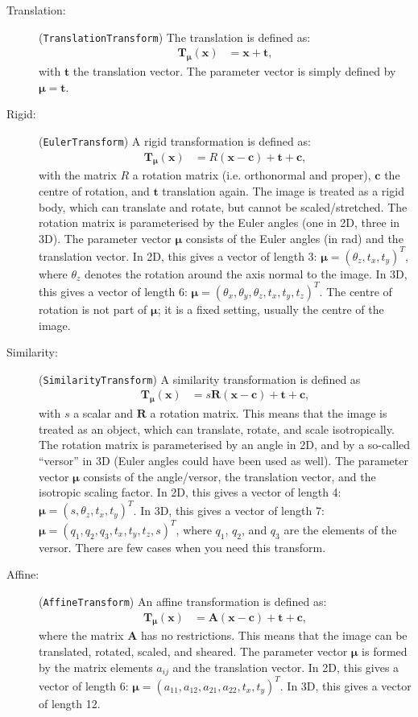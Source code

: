 \documentclass[]{report}
\newcommand{\vx}{\bm{x}}
\newcommand{\vmu}{\bm{\mu}}
\newcommand{\vTmx}{\bm{T}_{\vmu}(\bm{x})}
\begin{document}
\begin{description}
\item[Translation:] (\texttt{TranslationTransform}) The translation is defined as:
\begin{align}
\vTmx &= \vx + \bm{t},
\end{align}
with $\bm{t}$ the translation vector. The parameter vector is
simply defined by $\vmu=\bm{t}$.

\item[Rigid:] (\texttt{EulerTransform}) A rigid transformation is defined as:
\begin{align}
\vTmx &= R (\vx - \bm{c}) + \bm{t} + \bm{c},
\end{align}
with the matrix $R$ a rotation matrix (i.e. orthonormal and
proper), $\bm{c}$ the centre of rotation, and $\bm{t}$ translation
again. The image is treated as a rigid body, which can translate
and rotate, but cannot be scaled/stretched. The rotation matrix is
parameterised by the Euler angles (one in 2D, three in 3D). The
parameter vector $\vmu$ consists of the Euler angles (in rad) and
the translation vector. In 2D, this gives a vector of length 3:
$\vmu = (\theta_z, t_x, t_y)^T$, where $\theta_z$ denotes the
rotation around the axis normal to the image. In 3D, this gives a
vector of length 6: $\vmu = (\theta_x, \theta_y, \theta_z, t_x,
t_y, t_z)^T$. The centre of rotation is not part of $\vmu$; it is
a fixed setting, usually the centre of the image.

\item[Similarity:] (\texttt{SimilarityTransform}) A similarity transformation is defined as
\begin{align}
\vTmx &= s \bm{R} (\vx - \bm{c}) + \bm{t} + \bm{c},
\end{align}
with $s$ a scalar and $\bm{R}$ a rotation matrix. This means that the image
is treated as an object, which can translate, rotate, and scale
isotropically. The rotation matrix is parameterised by an angle in 2D, and
by a so-called ``versor'' in 3D (Euler angles could have been used as
well). The parameter vector $\vmu$ consists of the angle/versor, the
translation vector, and the isotropic scaling factor. In 2D, this gives a
vector of length 4: $\vmu = (s, \theta_z, t_x, t_y)^T$. In 3D, this gives a
vector of length 7: $\vmu = (q_1, q_2, q_3, t_x, t_y, t_z, s)^T$, where
$q_1$, $q_2$, and $q_3$ are the elements of the versor. There are few cases
when you need this transform.

\item[Affine:] (\texttt{AffineTransform}) An affine transformation is defined as:
\begin{align}
\vTmx &= \bm{A} (\vx - \bm{c}) + \bm{t} + \bm{c},
\end{align}
where the matrix $\bm{A}$ has no restrictions. This means that the
image can be translated, rotated, scaled, and sheared. The parameter
vector $\vmu$ is formed by the matrix elements $a_{ij}$ and the
translation vector. In 2D, this gives a vector of length 6:
$\vmu=(a_{11}, a_{12}, a_{21}, a_{22}, t_x, t_y)^T$. In 3D, this
gives a vector of length 12.


\end{description}
\end{document}
